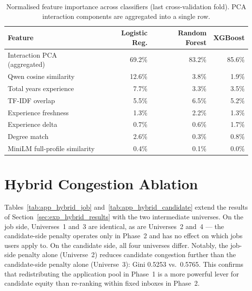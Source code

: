 \begin{appendices}
\begin{table}[htbp]
    \centering
    \caption{Normalised feature importance across classifiers (last cross-validation 
    fold). PCA interaction components are aggregated into a single row.}
    \label{tab:recruiter_feature_importance}
    \begin{tabular}{lrrr}
        \toprule
        \textbf{Feature} & \textbf{Logistic Reg.} & \textbf{Random Forest} 
                         & \textbf{XGBoost} \\
        \midrule
        Interaction PCA (aggregated) & 69.2\% & 83.2\% & 85.6\% \\
        Qwen cosine similarity       & 12.6\% &  3.8\% &  1.9\% \\
        Total years experience       &  7.7\% &  3.3\% &  3.5\% \\
        TF-IDF overlap               &  5.5\% &  6.5\% &  5.2\% \\
        Experience freshness         &  1.3\% &  2.2\% &  1.3\% \\
        Experience delta             &  0.7\% &  0.6\% &  1.7\% \\
        Degree match       &  2.6\% &  0.3\% &  0.8\% \\
        MiniLM full-profile similarity &  0.4\% &  0.1\% &  0.0\% \\
        \bottomrule
    \end{tabular}
\end{table}

\newpage
\section*{Hybrid Congestion Ablation}
\label{app:hybrid_ablation}

Tables~\ref{tab:app_hybrid_job} and~\ref{tab:app_hybrid_candidate} extend 
the results of Section~\ref{sec:exp_hybrid_results} with the two intermediate 
universes. On the job side, Universes~1 and~3 are identical, as are 
Universes~2 and~4 --- the candidate-side penalty operates only in Phase~2 
and has no effect on which jobs users apply to. On the candidate side, all 
four universes differ. Notably, the job-side penalty alone (Universe~2) 
reduces candidate congestion further than the candidate-side penalty alone 
(Universe~3): Gini 0.5253 vs.\ 0.5765. This confirms that redistributing 
the application pool in Phase~1 is a more powerful lever for candidate equity 
than re-ranking within fixed inboxes in Phase~2.


\end{appendices}
